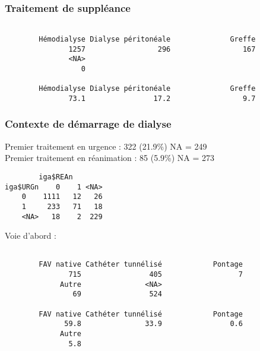 \documentclass[11pt,a4paper]{article}\usepackage[]{graphicx}\usepackage[]{color}
\makeatletter
\newenvironment{kframe}{%
 \def\at@end@of@kframe{}%
 \ifinner\ifhmode%
  \def\at@end@of@kframe{\end{minipage}}%
  \begin{minipage}{\columnwidth}%
 \fi\fi%
 \def\FrameCommand##1{\hskip\@totalleftmargin \hskip-\fboxsep
 \colorbox{shadecolor}{##1}\hskip-\fboxsep
     \hskip-\linewidth \hskip-\@totalleftmargin \hskip\columnwidth}%
 \MakeFramed {\advance\hsize-\width
   \@totalleftmargin\z@ \linewidth\hsize
   \@setminipage}}%
 {\par\unskip\endMakeFramed%
 \at@end@of@kframe}
\newenvironment{knitrout}{}{} %
\makeatother
\begin{document}
    \subsubsection{Traitement de suppléance}

\begin{knitrout}
\color{fgcolor}\begin{kframe}
\begin{verbatim}

        Hémodialyse Dialyse péritonéale              Greffe 
               1257                 296                 167 
               <NA> 
                  0 

        Hémodialyse Dialyse péritonéale              Greffe 
               73.1                17.2                 9.7 
\end{verbatim}
\end{kframe}
\end{knitrout}


    \subsubsection{Contexte de démarrage de dialyse}
    
Premier traitement en urgence :  322 (21.9\%) NA = 249
~\\

Premier traitement en réanimation :  85 (5.9\%) NA = 273

\begin{knitrout}
\color{fgcolor}\begin{kframe}
\begin{verbatim}
        iga$REAn
iga$URGn    0    1 <NA>
    0    1111   12   26
    1     233   71   18
    <NA>   18    2  229
\end{verbatim}
\end{kframe}
\end{knitrout}

Voie d’abord :
\begin{knitrout}
\color{fgcolor}\begin{kframe}
\begin{verbatim}

        FAV native Cathéter tunnélisé            Pontage 
               715                405                  7 
             Autre               <NA> 
                69                524 

        FAV native Cathéter tunnélisé            Pontage 
              59.8               33.9                0.6 
             Autre 
               5.8 
\end{verbatim}
\end{kframe}
\end{knitrout}
\end{document}
